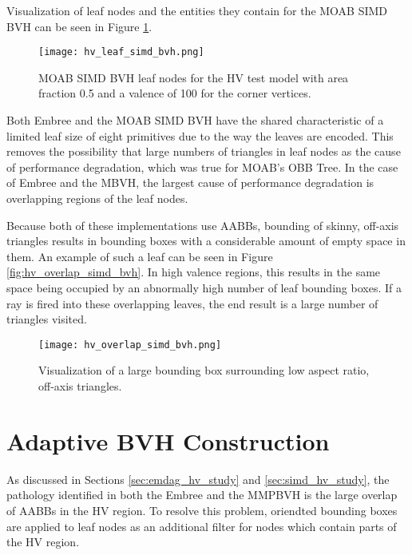 Visualization of leaf nodes and the entities they contain for the MOAB SIMD BVH
can be seen in Figure \ref{fig:hv_leaf_simd_bvh}.

  \begin{figure}
    \texttt{[image: hv\_leaf\_simd\_bvh.png]}
    \caption{MOAB SIMD BVH leaf nodes for the HV test model with area fraction
      0.5 and a valence of 100 for the corner vertices.}
    \label{fig:hv_leaf_simd_bvh}
  \end{figure}
  
Both Embree and the MOAB SIMD BVH have the shared characteristic of a limited
leaf size of eight primitives due to the way the leaves are encoded. This
removes the possibility that large numbers of triangles in leaf nodes as the
cause of performance degradation, which was true for MOAB's OBB Tree. In the case
of Embree and the MBVH, the largest cause of performance degradation is
overlapping regions of the leaf nodes.

Because both of these implementations use AABBs, bounding of skinny, off-axis
triangles results in bounding boxes with a considerable amount of empty space in
them. An example of such a leaf can be seen in Figure
\ref{fig:hv_overlap_simd_bvh}.  In high valence regions, this results in the
same space being occupied by an abnormally high number of leaf bounding
boxes. If a ray is fired into these overlapping leaves, the end result is a
large number of triangles visited.

\begin{figure}
  \texttt{[image: hv\_overlap\_simd\_bvh.png]}
  \caption{Visualization of a large bounding box surrounding low aspect ratio, off-axis triangles.}
  \label{fig:hv_overlap_simd_bvh.png}
\end{figure}

\section{Adaptive BVH Construction}

As discussed in Sections \ref{sec:emdag_hv_study} and \ref{sec:simd_hv_study},
the pathology identified in both the Embree and the MMPBVH is the large overlap
of AABBs in the HV region. To resolve this problem, oriendted bounding boxes are
applied to leaf nodes as an additional filter for nodes which contain parts of
the HV region.  
